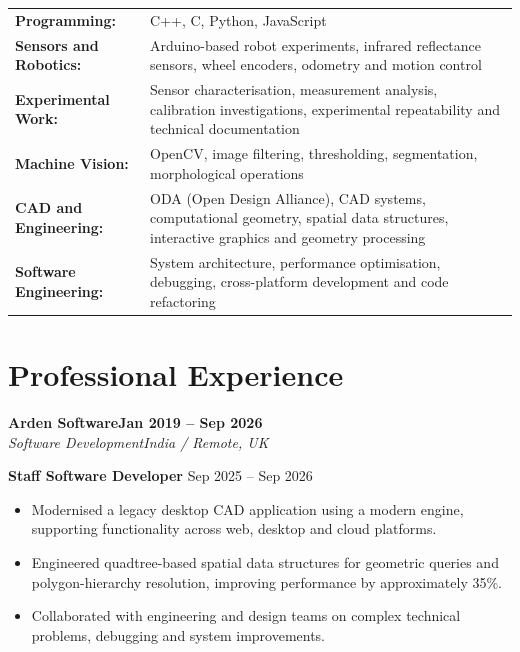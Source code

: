 \documentclass[10pt,a4paper]{article}
\newcommand{\cventry}[4]{
    \textbf{#1}\hfill\textbf{#2}\\
    \textit{#3}\hfill\textit{#4}
    \par
}
\begin{document}
\begin{tabularx}{\textwidth}{@{}l X@{}}

\textbf{Programming:} &
C++, C, Python, JavaScript \\[3pt]

\textbf{Sensors and Robotics:} &
Arduino-based robot experiments, infrared
reflectance sensors, wheel encoders,
odometry and motion control \\[3pt]

\textbf{Experimental Work:} &
Sensor characterisation, measurement analysis,
calibration investigations, experimental
repeatability and technical documentation \\[3pt]

\textbf{Machine Vision:} &
OpenCV, image filtering, thresholding,
segmentation, morphological operations \\[3pt]

\textbf{CAD and Engineering:} &
ODA (Open Design Alliance), CAD systems,
computational geometry, spatial data structures,
interactive graphics and geometry processing \\[3pt]

\textbf{Software Engineering:} &
System architecture, performance optimisation,
debugging, cross-platform development
and code refactoring

\end{tabularx}

\section*{Professional Experience}


\cventry
    {Arden Software}
    {Jan 2019 -- Sep 2026}
    {Software Development}
    {India / Remote, UK}

\textbf{Staff Software Developer}
\hfill Sep 2025 -- Sep 2026

\begin{itemize}
    \item Modernised a legacy desktop CAD
    application using a modern engine,
    supporting functionality across web,
    desktop and cloud platforms.

    \item Engineered quadtree-based spatial
    data structures for geometric queries
    and polygon-hierarchy resolution,
    improving performance by approximately
    35\%.

    \item Collaborated with engineering
    and design teams on complex technical
    problems, debugging and system improvements.
\end{itemize}
\end{document}
